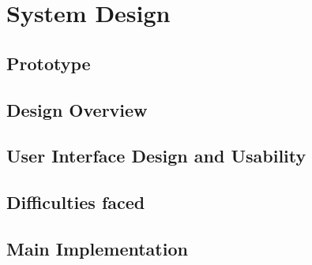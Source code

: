 
\chapter {System Design}

\section{Prototype}

\section{Design Overview}

\section{User Interface Design and Usability}

\section{Difficulties faced}

\section{Main Implementation}
